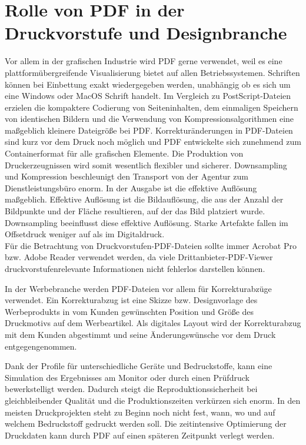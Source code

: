 \section{Rolle von PDF in der Druckvorstufe und Designbranche}
Vor allem in der grafischen Industrie wird PDF gerne verwendet, weil es eine plattformübergreifende Visualisierung bietet auf allen Betriebssystemen. Schriften können bei Einbettung exakt wiedergegeben werden, unabhängig ob es sich um eine Windows oder MacOS Schrift handelt. Im Vergleich zu PostScript-Dateien erzielen die kompaktere Codierung von Seiteninhalten, dem einmaligen Speichern von identischen Bildern und die Verwendung von Kompressionsalgorithmen eine maßgeblich kleinere Dateigröße bei PDF. Korrekturänderungen in PDF-Dateien sind kurz vor dem Druck noch möglich und PDF entwickelte sich zunehmend zum Containerformat für alle grafischen Elemente. Die Produktion von Druckerzeugnissen wird somit wesentlich flexibler und sicherer. Downsampling und Kompression beschleunigt den Transport von der Agentur zum Dienstleistungsbüro enorm. In der Ausgabe ist die effektive Auflösung maßgeblich. Effektive Auflösung ist die Bildauflösung, die aus der Anzahl der Bildpunkte und der Fläche resultieren, auf der das Bild platziert wurde. Downsampling beeinflusst diese effektive Auflösung. Starke Artefakte fallen im Offsetdruck weniger auf als im Digitaldruck. \\ \cite{schneeberger}
Für die Betrachtung von Druckvorstufen-PDF-Dateien sollte immer Acrobat Pro bzw. Adobe Reader verwendet werden, da viele Drittanbieter-PDF-Viewer druckvorstufenrelevante Informationen nicht fehlerlos darstellen können. \cite{schneeberger}

In der Werbebranche werden PDF-Dateien vor allem für Korrekturabzüge verwendet. Ein Korrekturabzug ist eine Skizze bzw. Designvorlage des Werbeprodukts in vom Kunden gewünschten Position und Größe des Druckmotivs auf dem Werbeartikel. Als digitales Layout wird der Korrekturabzug mit dem Kunden abgestimmt und seine Änderungswünsche vor dem Druck entgegengenommen. \cite{korrektur}

Dank der Profile für unterschiedliche Geräte und Bedruckstoffe, kann eine Simulation des Ergebnisses am Monitor oder durch einen Prüfdruck bewerkstelligt werden. Dadurch steigt die Reproduktionssicherheit bei gleichbleibender Qualität und die Produktionszeiten verkürzen sich enorm. In den meisten Druckprojekten steht zu Beginn noch nicht fest, wann, wo und auf welchem Bedruckstoff gedruckt werden soll. Die zeitintensive Optimierung der Druckdaten kann durch PDF auf einen späteren Zeitpunkt verlegt werden.

